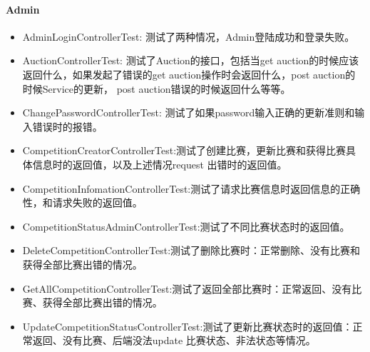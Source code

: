 \documentclass{article}
\begin{document}
		\paragraph{Admin}
			\begin{itemize}
			\item AdminLoginControllerTest: 测试了两种情况，Admin登陆成功和登录失败。
			\item AuctionControllerTest: 测试了Auction的接口，包括当get auction的时候应该返回什么，如果发起了错误的get auction操作时会返回什么，post auction的时候Service的更新， post auction错误的时候返回什么等等。
			\item ChangePasswordControllerTest: 测试了如果password输入正确的更新准则和输入错误时的报错。
			\item CompetitionCreatorControllerTest:测试了创建比赛，更新比赛和获得比赛具体信息时的返回值，以及上述情况request 出错时的返回值。
			\item CompetitionInfomationControllerTest:测试了请求比赛信息时返回信息的正确性，和请求失败的返回值。
			\item CompetitionStatusAdminControllerTest:测试了不同比赛状态时的返回值。
			\item DeleteCompetitionControllerTest:测试了删除比赛时：正常删除、没有比赛和获得全部比赛出错的情况。
			\item GetAllCompetitionControllerTest:测试了返回全部比赛时：正常返回、没有比赛、获得全部比赛出错的情况。
			\item UpdateCompetitionStatusControllerTest:测试了更新比赛状态时的返回值：正常返回、没有比赛、后端没法update 比赛状态、非法状态等情况。
			\end{itemize}
\end{document}
